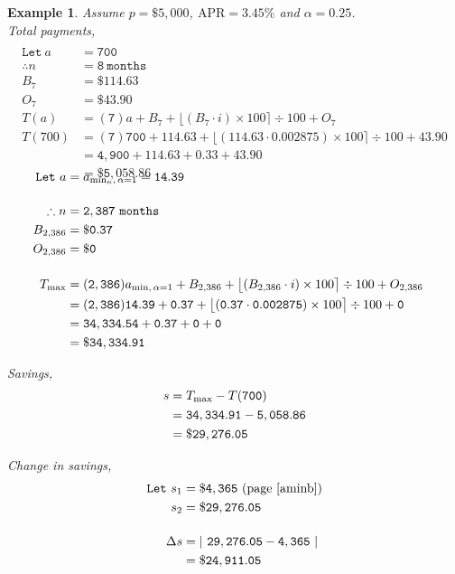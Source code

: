\documentclass[12pt,letterpaper,oneside]{article}
\newtheorem{example}{Example}[section]
\theoremstyle{remark} %
\begin{document}
	\newpage
	\begin{example}
	Assume $p=\$5,000$, $\mbox{APR}=3.45\%$ and $\alpha=0.25$.\\[12pt]
	Total payments,
	\begin{align*}
	\\\mathtt{Let\ } a&=\mathtt{700}\\[12pt]
	\therefore n&=\mathtt{8\ months}\\
	B_{7}&=\mathtt{\$114.63}\\
	O_{7}&=\mathtt{\$43.90}\\[12pt]		
	T(a)&=(\mathtt{7}) a+B_{7}+\big\lfloor{\left(B_{7}\cdot i\right)\times 100}\big\rceil\div 100+O_{7}\\
	T(700)&=(\mathtt{7}) \mathtt{700}+\mathtt{114.63}+\big\lfloor{\left(\mathtt{114.63}\cdot \mathtt{0.002875}\right)\times 100}\big\rceil\div 100+\mathtt{43.90}\\
	&=\mathtt{4,900}+\mathtt{114.63}+\mathtt{0.33}+\mathtt{43.90}\\
	&=\mathtt{\$5,058.86}
	\end{align*}

	\label{aminc}
	\begin{align*}\\[-36pt]
	\mathtt{Let\ } a&=a_{\rm{min_{\mathnormal{n}},\,\alpha=1}}=\mathtt{14.39}\\[12pt]
	\therefore n&=\mathtt{2,387\ months}\\
	B_{2,386}&=\mathtt{\$0.37}\\
	O_{2,386}&=\mathtt{\$0}\\[12pt]		
	T_{\rm{max}}&=(\mathtt{2,386}) a_{\rm{min},\,\alpha=1}+B_{2,386}+\big\lfloor{\left(B_{2,386}\cdot i\right)\times 100}\big\rceil\div 100+O_{2,386}\\
	&=(\mathtt{2,386}) \mathtt{14.39}+\mathtt{0.37}+\big\lfloor{\left(\mathtt{0.37}\cdot \mathtt{0.002875}\right)\times 100}\big\rceil\div 100+\mathtt{0}\\
	&=\mathtt{34,334.54}+\mathtt{0.37}+\mathtt{0}+\mathtt{0}\\
	&=\mathtt{\$34,334.91}
	\end{align*}

	\vspace{12pt}
	Savings,
	\begin{align*}
	s&=T_{\rm{max}}-T(\mathtt{700})\\
	&=\mathtt{34,334.91}-\mathtt{5,058.86}\\
	&=\mathtt{\$29,276.05}
	\end{align*}

	Change in savings,
	\begin{align*}
	\mathtt{Let\ }s_{1}&=\mathtt{\$4,365}\ \mbox{(page\ \pageref{aminb})}\\
	s_{2}&=\mathtt{\$29,276.05}\\[12pt]
	\Delta s&=\left|\ \mathtt{29,276.05}-\mathtt{4,365}\ \right|\\
	&=\mathtt{\$24,911.05}
	\end{align*}
	\end{example}
\end{document}
